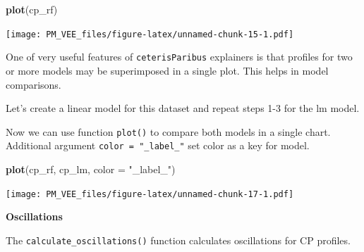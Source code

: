 \documentclass[]{book}
\newenvironment{Shaded}{\begin{snugshade}}{\end{snugshade}}
\newcommand{\DataTypeTok}[1]{\textcolor[rgb]{0.13,0.29,0.53}{#1}}
\newcommand{\KeywordTok}[1]{\textcolor[rgb]{0.13,0.29,0.53}{\textbf{#1}}}
\newcommand{\NormalTok}[1]{#1}
\newcommand{\OperatorTok}[1]{\textcolor[rgb]{0.81,0.36,0.00}{\textbf{#1}}}
\newcommand{\StringTok}[1]{\textcolor[rgb]{0.31,0.60,0.02}{#1}}
\theoremstyle{definition}
\theoremstyle{definition}
\theoremstyle{definition}
\theoremstyle{remark}
\begin{document}
\begin{Shaded}
\begin{Highlighting}[]
\KeywordTok{plot}\NormalTok{(cp_rf) }
\end{Highlighting}
\end{Shaded}

\texttt{[image: PM\_VEE\_files/figure-latex/unnamed-chunk-15-1.pdf]}

One of very useful features of \texttt{ceterisParibus} explainers is
that profiles for two or more models may be superimposed in a single
plot. This helps in model comparisons.

Let's create a linear model for this dataset and repeat steps 1-3 for
the lm model.

\begin{Shaded}
\end{Shaded}

Now we can use function \texttt{plot()} to compare both models in a
single chart. Additional argument \texttt{color\ =\ "\_label\_"} set
color as a key for model.

\begin{Shaded}
\begin{Highlighting}[]
\KeywordTok{plot}\NormalTok{(cp_rf, cp_lm, }\DataTypeTok{color =} \StringTok{"_label_"}\NormalTok{)}
\end{Highlighting}
\end{Shaded}

\texttt{[image: PM\_VEE\_files/figure-latex/unnamed-chunk-17-1.pdf]}

\textbf{Oscillations}

The \texttt{calculate\_oscillations()} function calculates oscillations
for CP profiles.
\end{document}
